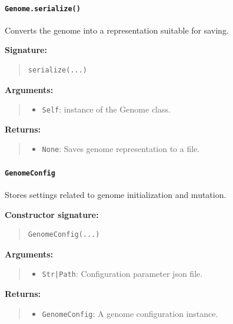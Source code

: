 \documentclass[11pt]{article}
\begin{document}
\paragraph{\texttt{Genome.serialize()}}

Converts the genome into a representation suitable for saving.

\textbf{Signature:}
\begin{quote}
\begin{verbatim}
serialize(...)
\end{verbatim}
\end{quote}

\textbf{Arguments:}
\begin{quote}
\begin{itemize}
    \item \texttt{Self}: instance of the Genome class.
\end{itemize}
\end{quote}

\textbf{Returns:}
\begin{quote}
\begin{itemize}
    \item \texttt{None}: Saves genome representation to a file.
\end{itemize}
\end{quote}

\paragraph{\texttt{GenomeConfig}}

Stores settings related to genome initialization and mutation.

\textbf{Constructor signature:}
\begin{quote}
\begin{verbatim}
GenomeConfig(...)
\end{verbatim}
\end{quote}

\textbf{Arguments:}
\begin{quote}
\begin{itemize}
    \item \texttt{Str|Path}: Configuration parameter json file.
\end{itemize}
\end{quote}

\textbf{Returns:}
\begin{quote}
\begin{itemize}
    \item \texttt{GenomeConfig}: A genome configuration instance.
\end{itemize}
\end{quote}
\end{document}
